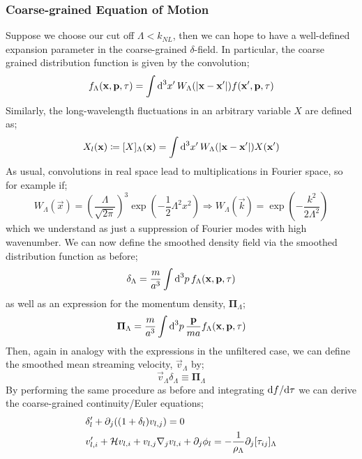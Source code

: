 \subsubsection{Coarse-grained Equation of Motion}
Suppose we choose our cut off $\Lambda < k_{NL}$, then we can hope to have a well-defined expansion parameter in the coarse-grained $\delta$-field. In particular, the coarse grained distribution function is given by the convolution;
\begin{equation}
f_\Lambda(\vec{x}, \vec{p}, \tau) = \int{\upd{^3 x\pr}W_\Lambda(\abs{\vec{x} - \vec{x}\pr})f(\vec{x}\pr, \vec{p}, \tau)}
\end{equation}
Similarly, the long-wavelength fluctuations in an arbitrary variable $X$ are defined as;
\begin{equation}
X_l(\vec{x}) \coloneqq [X]_\Lambda(\vec{x}) = \int{\upd{^3 x\pr}W_\Lambda(\abs{\vec{x} - \vec{x}\pr})X(\vec{x}\pr)}
\end{equation}
As usual, convolutions in real space lead to multiplications in Fourier space, so for example if;
\begin{equation*}
W_\Lambda(\vec{x}) = \left(\frac{\Lambda}{\sqrt{2\pi}}\right)^3 \exp\left(-\frac{1}{2}\Lambda^2 x^2\right) \Rightarrow W_\Lambda(\vec{k}) = \exp\left(-\frac{k^2}{2\Lambda^2}\right)
\end{equation*}
which we understand as just a suppression of Fourier modes with high wavenumber. We can now define the smoothed density field via the smoothed distribution function as before;
\begin{equation}
\delta_\Lambda = \frac{m}{a^3}\int{\text{d}^3 p \,f_\Lambda(\mathbf{x}, \mathbf{p}, \tau)}
\end{equation}
as well as an expression for the momentum density, $\mathbf{\Pi}_\Lambda$;
\begin{equation}
\mathbf{\Pi}_\Lambda = \frac{m}{a^3}\int{\text{d}^3 p \,\frac{\mathbf{p}}{ma}f_\Lambda(\mathbf{x}, \mathbf{p}, \tau)}
\end{equation}
Then, again in analogy with the expressions in the unfiltered case, we can define the smoothed mean streaming velocity, $\vec{v}_\Lambda$ by;
\begin{equation*}
\vec{v}_\Lambda \delta_\Lambda \equiv \mathbf{\Pi}_\Lambda
\end{equation*}
By performing the same procedure as before and integrating $\text{d} f/\text{d} \tau$ we can derive the coarse-grained continuity/Euler equations;
\begin{align}
&\delta_l\pr + \del_j\left((1 + \delta_l)v_{l,j}\right) = 0 \\
&v_{l,i}\pr + \hamilt v_{l,i} + v_{l, j}\nabla_j v_{l, i} + \del_j \phi_l = -\frac{1}{\rho_\Lambda}\del_j [\tau_{ij}]_\Lambda
\end{align}
